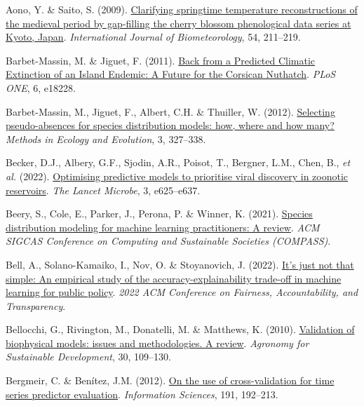 \documentclass[
  letterpaper,
]{scrbook}
\newlength{\cslhangindent}
\newenvironment{CSLReferences}[2] %
 {\begin{list}{}{%
  \setlength{\itemindent}{0pt}
  \setlength{\leftmargin}{0pt}
  \setlength{\parsep}{0pt}
  \ifodd #1
   \setlength{\leftmargin}{\cslhangindent}
   \setlength{\itemindent}{-1\cslhangindent}
  \fi
  \setlength{\itemsep}{#2\baselineskip}}}
 {\end{list}}
\begin{document}
\begin{CSLReferences}{1}{0}
Aono, Y. \& Saito, S. (2009).
\href{https://doi.org/10.1007/s00484-009-0272-x}{Clarifying springtime
temperature reconstructions of the medieval period by gap-filling the
cherry blossom phenological data series at Kyoto, Japan}.
\emph{International Journal of Biometeorology}, 54, 211--219.

Barbet-Massin, M. \& Jiguet, F. (2011).
\href{https://doi.org/10.1371/journal.pone.0018228}{Back from a
Predicted Climatic Extinction of an Island Endemic: A Future for the
Corsican Nuthatch}. \emph{PLoS ONE}, 6, e18228.

Barbet-Massin, M., Jiguet, F., Albert, C.H. \& Thuiller, W. (2012).
\href{https://doi.org/10.1111/j.2041-210x.2011.00172.x}{Selecting
pseudo-absences for species distribution models: how, where and how
many?} \emph{Methods in Ecology and Evolution}, 3, 327--338.

Becker, D.J., Albery, G.F., Sjodin, A.R., Poisot, T., Bergner, L.M.,
Chen, B., \emph{et al.} (2022).
\href{https://doi.org/10.1016/s2666-5247(21)00245-7}{Optimising
predictive models to prioritise viral discovery in zoonotic reservoirs}.
\emph{The Lancet Microbe}, 3, e625--e637.

Beery, S., Cole, E., Parker, J., Perona, P. \& Winner, K. (2021).
\href{https://doi.org/10.1145/3460112.3471966}{Species distribution
modeling for machine learning practitioners: A review}. \emph{ACM SIGCAS
Conference on Computing and Sustainable Societies (COMPASS)}.

Bell, A., Solano-Kamaiko, I., Nov, O. \& Stoyanovich, J. (2022).
\href{https://doi.org/10.1145/3531146.3533090}{It{'}s just not that
simple: An empirical study of the accuracy-explainability trade-off in
machine learning for public policy}. \emph{2022 ACM Conference on
Fairness, Accountability, and Transparency}.

Bellocchi, G., Rivington, M., Donatelli, M. \& Matthews, K. (2010).
\href{https://doi.org/10.1051/agro/2009001}{Validation of biophysical
models: issues and methodologies. A review}. \emph{Agronomy for
Sustainable Development}, 30, 109--130.

Bergmeir, C. \& Benítez, J.M. (2012).
\href{https://doi.org/10.1016/j.ins.2011.12.028}{On the use of
cross-validation for time series predictor evaluation}.
\emph{Information Sciences}, 191, 192--213.


\end{CSLReferences}
\end{document}

